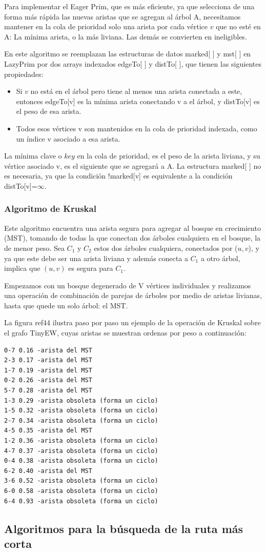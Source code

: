 \documentclass[a4paper, 11pt]{report}
\begin{document}
Para implementar el Eager Prim, que es más eficiente, ya que selecciona de una forma más rápida las nuevas aristas que se agregan al árbol A, necesitamos mantener en la cola de prioridad solo una arista por cada vértice $v$ que no esté en A: La mínima arista, o la más liviana. Las demás se convierten en ineligibles.

En este algoritmo se reemplazan las estructuras de datos marked[ ] y mst[ ] en LazyPrim por dos arrays indexados edgeTo[ ] y distTo[ ], que tienen las siguientes propiedades:

\begin{itemize}
\item Si $v$ no está en el árbol pero tiene al menos una arista conectada a este, entonces edgeTo[v] es la mínima arista conectando v a el árbol, y distTo[v] es el peso de esa arista.
\item Todos esos vértices v son mantenidos en la cola de prioridad indexada, como un índice v asociado a esa arista.
\end{itemize} 
La mínima clave o $key$ en la cola de prioridad, es el peso de la arista liviana, y su vértice asociado v, es el siguiente que se agregará a A. La estructura marked[ ] no es necesaria, ya que la condición !marked[v] es equivalente a la condición distTo[v]=$\infty$.   

\subsubsection{Algoritmo de Kruskal}
Este algoritmo encuentra una arista segura para agregar al bosque en crecimiento (MST), tomando de todas la que conectan dos árboles cualquiera en el bosque, la de menor peso. Sea $C_1$ y $C_2$ estos dos árboles cualquiera, conectados por ($u, v$), y ya que este debe ser una arista liviana y además conecta a $C_1$ a otro árbol, implica que $(u, v)$ es segura para $C_1$. 

Empezamos con un bosque degenerado de V vértices individuales y realizamos una operación de combinación de parejas de árboles por medio de aristas livianas, hasta que quede un solo árbol: el MST.

La figura ref44 ilustra paso por paso un ejemplo de la operación de Kruskal sobre el grafo TinyEW, cuyas aristas se muestran ordenas por peso a continuación: 

\begin{verbatim}
0-7 0.16 -arista del MST
2-3 0.17 -arista del MST
1-7 0.19 -arista del MST
0-2 0.26 -arista del MST
5-7 0.28 -arista del MST
1-3 0.29 -arista obsoleta (forma un ciclo)
1-5 0.32 -arista obsoleta (forma un ciclo)
2-7 0.34 -arista obsoleta (forma un ciclo)
4-5 0.35 -arista del MST
1-2 0.36 -arista obsoleta (forma un ciclo)
4-7 0.37 -arista obsoleta (forma un ciclo)
0-4 0.38 -arista obsoleta (forma un ciclo)
6-2 0.40 -arista del MST
3-6 0.52 -arista obsoleta (forma un ciclo)
6-0 0.58 -arista obsoleta (forma un ciclo)
6-4 0.93 -arista obsoleta (forma un ciclo)
\end{verbatim}


\newpage
\subsection{Algoritmos para la b\'usqueda de la ruta m\'as corta}
\end{document}
